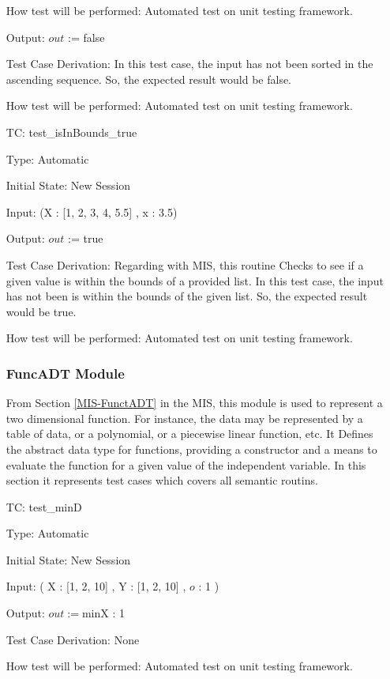 \documentclass[12pt]{article}
\newcounter{utestnum} %
\begin{document}
\begin{enumerate}[label=TC\arabic*:,ref={\arabic*}]
	How test will be performed: Automated test on unit testing framework.


Output: $out$ := false

Test Case Derivation: In this test case, the input has not been sorted in the ascending sequence. So, the expected result would be false.

How test will be performed: Automated test on unit testing framework.

\item [TC\refstepcounter{utestnum}\theutestnum: \label{isInBoundsTest}] 
test\_isInBounds\_true

Type: Automatic

Initial State: New Session

Input: (X : [1, 2, 3, 4, 5.5] , x : 3.5)

Output: $out$ := true

Test Case Derivation: Regarding with MIS, this routine Checks to see if a given value is within the bounds of a provided list. In this test case, the input has not been is within the bounds of the given list. So, the expected result would be true.

How test will be performed: Automated test on unit testing framework.


\subsubsection{FuncADT Module}	
From Section \ref{MIS-FunctADT} in the MIS, this module is used to represent a two dimensional
function.  For instance, the data may be represented by a table of data, or a
polynomial, or a piecewise linear function, etc.
It Defines the abstract data type for functions, providing a
constructor and a means to evaluate the function for a given value of the
independent variable. In this section it represents test cases which covers all semantic routins.



\item [TC\refstepcounter{utestnum}\theutestnum: \label{FuncTminDTest}] 
test\_minD

Type: Automatic

Initial State: New Session

Input: ( X : [1, 2, 10] , Y : [1, 2, 10] , $o$ : 1 )

Output: $out := \mbox{minX}$ : 1


Test Case Derivation: None

How test will be performed: Automated test on unit testing framework.


\end{enumerate}
\end{document}
